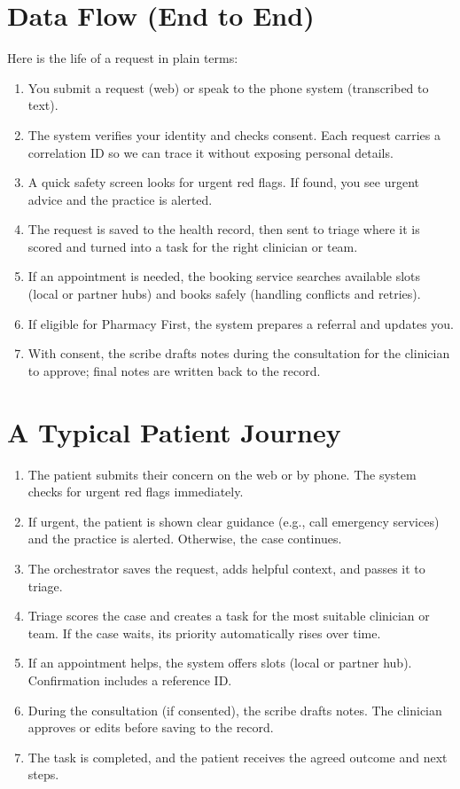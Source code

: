 \documentclass[11pt]{article}
\begin{document}
\section*{Data Flow (End to End)}
Here is the life of a request in plain terms:
\begin{enumerate}
  \item You submit a request (web) or speak to the phone system (transcribed to text).
  \item The system verifies your identity and checks consent. Each request carries a correlation ID so we can trace it without exposing personal details.
  \item A quick safety screen looks for urgent red flags. If found, you see urgent advice and the practice is alerted.
  \item The request is saved to the health record, then sent to triage where it is scored and turned into a task for the right clinician or team.
  \item If an appointment is needed, the booking service searches available slots (local or partner hubs) and books safely (handling conflicts and retries).
  \item If eligible for Pharmacy First, the system prepares a referral and updates you.
  \item With consent, the scribe drafts notes during the consultation for the clinician to approve; final notes are written back to the record.
\end{enumerate}

\section*{A Typical Patient Journey}
\begin{enumerate}
  \item The patient submits their concern on the web or by phone. The system checks for urgent red flags immediately.
  \item If urgent, the patient is shown clear guidance (e.g., call emergency services) and the practice is alerted. Otherwise, the case continues.
  \item The orchestrator saves the request, adds helpful context, and passes it to triage.
  \item Triage scores the case and creates a task for the most suitable clinician or team. If the case waits, its priority automatically rises over time.
  \item If an appointment helps, the system offers slots (local or partner hub). Confirmation includes a reference ID.
  \item During the consultation (if consented), the scribe drafts notes. The clinician approves or edits before saving to the record.
  \item The task is completed, and the patient receives the agreed outcome and next steps.
\end{enumerate}
\end{document}
